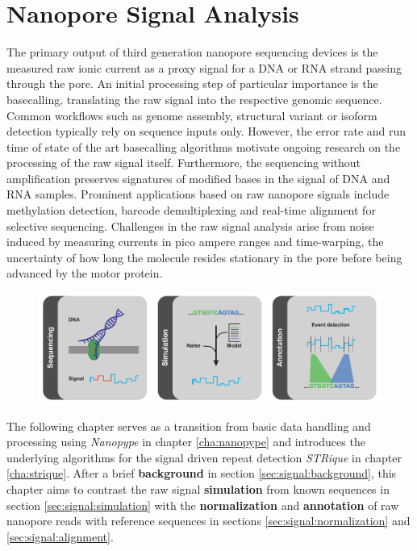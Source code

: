 \chapter{Nanopore Signal Analysis}
\label{cha:signal}

The primary output of third generation nanopore sequencing devices is the measured raw ionic current as a proxy signal for a DNA or RNA strand passing through the pore. 
An initial processing step of particular importance is the basecalling, translating the raw signal into the respective genomic sequence.
Common workflows such as genome assembly, structural variant or isoform detection typically rely on sequence inputs only.
However, the error rate and run time of state of the art basecalling algorithms motivate ongoing research on the processing of the raw signal itself. Furthermore, the sequencing without amplification preserves signatures of modified bases in the signal of DNA and RNA samples.
Prominent applications based on raw nanopore signals include methylation detection, barcode demultiplexing and real-time alignment for selective sequencing.
Challenges in the raw signal analysis arise from noise induced by measuring currents in pico ampere ranges and time-warping, the uncertainty of how long the molecule resides stationary in the pore before being advanced by the motor protein.


\begin{figure}[h]
    \centering
    \includegraphics[width=1.0\textwidth]{figures/signal/GA.pdf}
    \label{fig:signal:ga}
\end{figure}


The following chapter serves as a transition from basic data handling and processing using \textit{Nanopype} in chapter \ref{cha:nanopype} and introduces the underlying algorithms for the signal driven repeat detection \textit{STRique} in chapter \ref{cha:strique}.
After a brief \textbf{background} in section \ref{sec:signal:background}, this chapter aims to contrast the raw signal \textbf{simulation} from known sequences in section \ref{sec:signal:simulation} with the \textbf{normalization} and \textbf{annotation} of raw nanopore reads with reference sequences in sections \ref{sec:signal:normalization} and \ref{sec:signal:alignment}.

